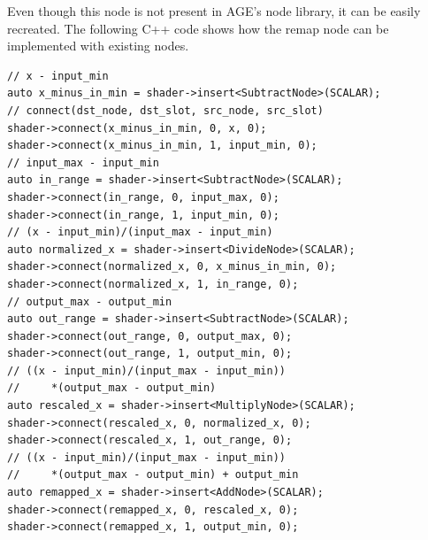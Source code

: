 \documentclass[
  digital,     %
  oneside,     %
  nosansbold,  %
  nocolorbold, %
  lof,         %
  lot,         %
]{fithesis4}
\begin{document}
Even though this node is not present in AGE's node library, it can be easily recreated.
The following C++ code shows how the remap node can be implemented with existing nodes.
\begin{verbatim}
// x - input_min
auto x_minus_in_min = shader->insert<SubtractNode>(SCALAR);
// connect(dst_node, dst_slot, src_node, src_slot)
shader->connect(x_minus_in_min, 0, x, 0);
shader->connect(x_minus_in_min, 1, input_min, 0);
// input_max - input_min
auto in_range = shader->insert<SubtractNode>(SCALAR);
shader->connect(in_range, 0, input_max, 0);
shader->connect(in_range, 1, input_min, 0);
// (x - input_min)/(input_max - input_min)
auto normalized_x = shader->insert<DivideNode>(SCALAR);
shader->connect(normalized_x, 0, x_minus_in_min, 0);
shader->connect(normalized_x, 1, in_range, 0);
// output_max - output_min
auto out_range = shader->insert<SubtractNode>(SCALAR);
shader->connect(out_range, 0, output_max, 0);
shader->connect(out_range, 1, output_min, 0);
// ((x - input_min)/(input_max - input_min))
//     *(output_max - output_min)
auto rescaled_x = shader->insert<MultiplyNode>(SCALAR);
shader->connect(rescaled_x, 0, normalized_x, 0);
shader->connect(rescaled_x, 1, out_range, 0);
// ((x - input_min)/(input_max - input_min))
//     *(output_max - output_min) + output_min
auto remapped_x = shader->insert<AddNode>(SCALAR);
shader->connect(remapped_x, 0, rescaled_x, 0);
shader->connect(remapped_x, 1, output_min, 0);
\end{verbatim}
\end{document}
